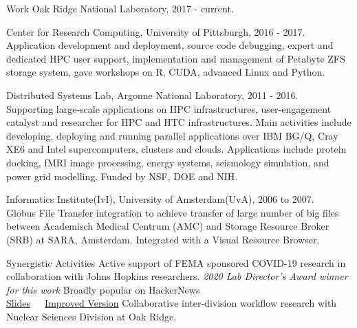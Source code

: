 \documentclass[11pt]{resume}
\begin{document}
\begin{category}{Work}
 Oak Ridge National Laboratory, 2017 - current.

 Center for Research Computing, University of Pittsburgh, 2016 - 2017.
Application development and deployment, source code debugging, expert and dedicated HPC user support,
implementation and management of Petabyte ZFS storage system, gave workshops on R, CUDA, advanced Linux and Python.

 Distributed Systems Lab, Argonne National
Laboratory, 2011 - 2016.\\
Supporting large-scale applications on HPC infrastructures, user-engagement
catalyst and researcher for HPC and HTC infrastructures. Main activities
include developing, deploying and running parallel applications over IBM BG/Q,
Cray XE6 and Intel supercomputers, clusters and clouds. Applications
include protein docking, fMRI image processing, energy systems,
seismology simulation, and power grid modelling. Funded by NSF, DOE and
NIH.

 Informatics Institute(IvI), University of
Amsterdam(UvA), 2006 to 2007.\\
Globus File Transfer integration to
achieve transfer of large number of big files between Academisch Medical
Centrum (AMC) and Storage Resource Broker (SRB) at SARA, Amsterdam. Integrated
with a Visual Resource Browser.

\end{category}

\begin{category}{Synergistic Activities}
 Active support of FEMA sponsored COVID-19 research in collaboration with Johns Hopkins researchers. \emph{2020 Lab Director's Award winner for this work}
 Broadly popular on HackerNews \\ 
\href{https://www.usenix.org/sites/default/files/conference/protected-files/lisa19_maheshwari.pdf}{Slides}~~~\href{https://ketancmaheshwari.github.io/pdfs/LPT_LISA.pdf}{Improved Version}
 Collaborative inter-division workflow research with Nuclear Sciences Division at Oak Ridge.
\end{category}
\end{document}
